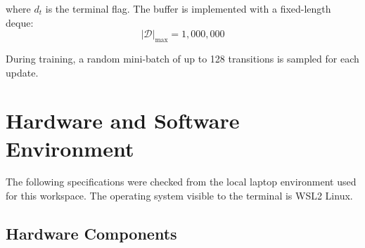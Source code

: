 \documentclass[11pt,a4paper]{article}
\begin{document}
where $d_t$ is the terminal flag. The buffer is implemented with a fixed-length deque:
\[
    |\mathcal{D}|_{\max} = 1{,}000{,}000
\]

During training, a random mini-batch of up to 128 transitions is sampled for each update.

\section{Hardware and Software Environment}

The following specifications were checked from the local laptop environment used for this workspace. The operating system visible to the terminal is WSL2 Linux.

\subsection{Hardware Components}
\end{document}
